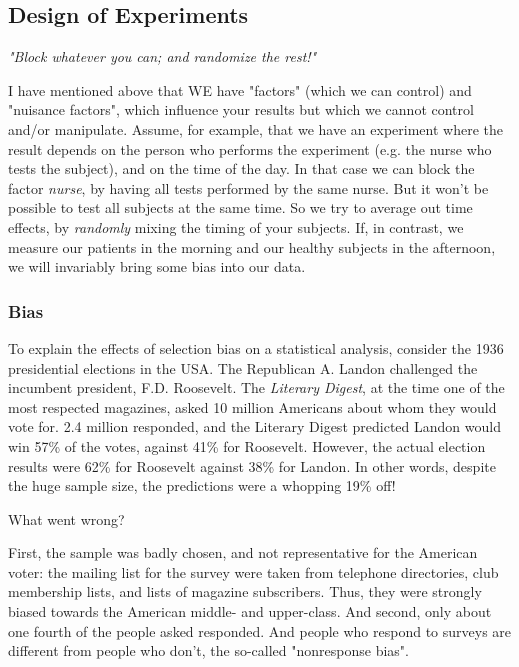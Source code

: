 \subsection{Design of Experiments}

\emph{"Block whatever you can; and randomize the rest!"}

\vspace{5 Mm}

I have mentioned above that WE have "factors" (which we can control) and "nuisance factors", which influence your results but which we cannot control and/or manipulate. Assume, for example, that we have an experiment where the result depends on the person who performs the experiment (e.g. the nurse who tests the subject), and on the time of the day. In that case we can \gls{block} the factor \emph{nurse}, by having all tests performed by the same nurse. But it won't be possible to test all subjects at the same time. So we try to average out time effects, by \emph{randomly} mixing the timing of your subjects. If, in contrast, we measure our patients in the morning and our healthy subjects in the afternoon, we will invariably bring some \gls{bias} into our data.

\subsubsection{Bias} 
To explain the effects of selection bias on a statistical analysis, consider the 1936 presidential elections in the USA. The Republican A. Landon challenged the incumbent president, F.D. Roosevelt. The \emph{Literary Digest}, at the time one of the most respected magazines, asked 10 million Americans about whom they would vote for. 2.4 million responded, and the Literary Digest predicted Landon would win 57\% of the votes, against 41\% for Roosevelt. However, the actual election results were 62\% for Roosevelt against 38\% for Landon. In other words, despite the huge sample size, the predictions were a whopping 19\% off!

What went wrong?

First, the sample was badly chosen, and not representative for the American voter: the mailing list for the survey were taken from telephone directories, club membership lists, and lists of magazine subscribers. Thus, they were strongly biased towards the American middle- and upper-class. And second, only about one fourth of the people asked responded. And people who respond to surveys are different from people who don't, the so-called "nonresponse bias".

